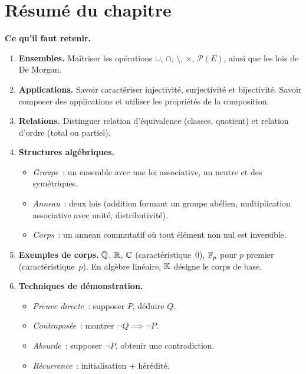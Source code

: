 \section*{Résumé du chapitre}

\begin{framed}
\textbf{Ce qu'il faut retenir.}

\begin{enumerate}[label=\textbf{\arabic*.},leftmargin=2em]
  \item \textbf{Ensembles.} Maîtriser les opérations $\cup$, $\cap$,
    $\setminus$, $\times$, $\mathcal{P}(E)$, ainsi que les lois de De Morgan.

  \item \textbf{Applications.} Savoir caractériser injectivité,
    surjectivité et bijectivité. Savoir composer des applications et
    utiliser les propriétés de la composition.

  \item \textbf{Relations.} Distinguer relation d'équivalence (classes,
    quotient) et relation d'ordre (total ou partiel).

  \item \textbf{Structures algébriques.}
    \begin{itemize}
      \item \emph{Groupe}~: un ensemble avec une loi associative, un neutre
        et des symétriques.
      \item \emph{Anneau}~: deux lois (addition formant un groupe abélien,
        multiplication associative avec unité, distributivité).
      \item \emph{Corps}~: un anneau commutatif où tout élément non nul
        est inversible.
    \end{itemize}

  \item \textbf{Exemples de corps.} ${\mathbb{Q}}$, ${\mathbb{R}}$, ${\mathbb{C}}$ (caractéristique~$0$),
    ${\mathbb{F}}_p$ pour $p$ premier (caractéristique~$p$). En algèbre linéaire,
    ${\mathbb{K}}$ désigne le corps de base.

  \item \textbf{Techniques de démonstration.}
    \begin{itemize}
      \item \emph{Preuve directe}~: supposer $P$, déduire $Q$.
      \item \emph{Contraposée}~: montrer $\lnot Q\implies\lnot P$.
      \item \emph{Absurde}~: supposer $\lnot P$, obtenir une contradiction.
      \item \emph{Récurrence}~: initialisation + hérédité.
    \end{itemize}
\end{enumerate}
\end{framed}
